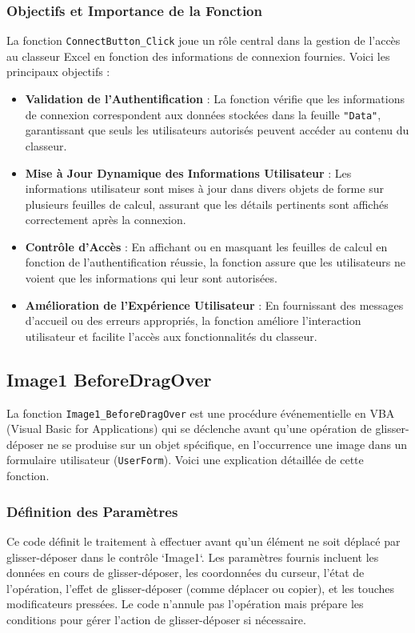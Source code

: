 \documentclass[a4paper, oneside, 12pt, final]{extreport}
\begin{document}
\subsubsection{Objectifs et Importance de la Fonction}

La fonction \texttt{ConnectButton\_Click} joue un rôle central dans la gestion de l'accès au classeur Excel en fonction des informations de connexion fournies. Voici les principaux objectifs :

\begin{itemize}
    \item \textbf{Validation de l'Authentification} : La fonction vérifie que les informations de connexion correspondent aux données stockées dans la feuille \texttt{"Data"}, garantissant que seuls les utilisateurs autorisés peuvent accéder au contenu du classeur.
    \item \textbf{Mise à Jour Dynamique des Informations Utilisateur} : Les informations utilisateur sont mises à jour dans divers objets de forme sur plusieurs feuilles de calcul, assurant que les détails pertinents sont affichés correctement après la connexion.
    \item \textbf{Contrôle d'Accès} : En affichant ou en masquant les feuilles de calcul en fonction de l'authentification réussie, la fonction assure que les utilisateurs ne voient que les informations qui leur sont autorisées.
    \item \textbf{Amélioration de l'Expérience Utilisateur} : En fournissant des messages d'accueil ou des erreurs appropriés, la fonction améliore l'interaction utilisateur et facilite l'accès aux fonctionnalités du classeur.
\end{itemize}
\subsection{Image1 BeforeDragOver}

La fonction \texttt{Image1\_BeforeDragOver} est une procédure événementielle en VBA (Visual Basic for Applications) qui se déclenche avant qu'une opération de glisser-déposer ne se produise sur un objet spécifique, en l'occurrence une image dans un formulaire utilisateur (\texttt{UserForm}). Voici une explication détaillée de cette fonction.

\subsubsection{Définition des Paramètres}
Ce code définit le traitement à effectuer avant qu'un élément ne soit déplacé par glisser-déposer dans le contrôle `Image1`. Les paramètres fournis incluent les données en cours de glisser-déposer, les coordonnées du curseur, l'état de l'opération, l'effet de glisser-déposer (comme déplacer ou copier), et les touches modificateurs pressées. Le code n'annule pas l'opération mais prépare les conditions pour gérer l'action de glisser-déposer si nécessaire.
\end{document}
